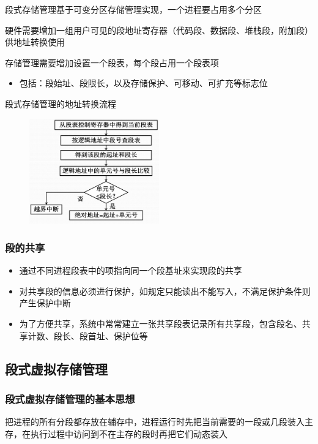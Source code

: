 \documentclass[cs4size,a4paper,10pt]{ctexart}
\begin{document}
		段式存储管理基于可变分区存储管理实现，一个进程要占用多个分区

		硬件需要增加一组用户可见的段地址寄存器（代码段、数据段、堆栈段，附加段）供地址转换使用

		存储管理需要增加设置一个段表，每个段占用一个段表项
		\begin{itemize}
			\item 包括：段始址、段限长，以及存储保护、可移动、可扩充等标志位
		\end{itemize}

		段式存储管理的地址转换流程
		\begin{figure}[H]
			\centering
			\includegraphics[width=0.5\textwidth]{img/3.4.1.2.3}
		\end{figure}

		\subsubsection{段的共享}
		\begin{itemize}
			\item 通过不同进程段表中的项指向同一个段基址来实现段的共享
			\item 对共享段的信息必须进行保护，如规定只能读出不能写入，不满足保护条件则产生保护中断
			\item 为了方便共享，系统中常常建立一张共享段表记录所有共享段，包含段名、共享计数、段长、段首址、保护位等
		\end{itemize}

		\subsection{段式虚拟存储管理}
		\subsubsection{段式虚拟存储管理的基本思想}
		把进程的所有分段都存放在辅存中，进程运行时先把当前需要的一段或几段装入主存，在执行过程中访问到不在主存的段时再把它们动态装入
\end{document}
